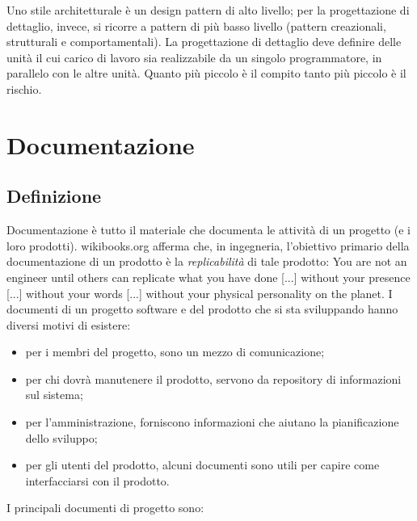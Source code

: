 \documentclass[a4paper]{article}
\begin{document}
		
Uno stile architetturale è un design pattern di alto livello; per la progettazione di dettaglio, invece, si ricorre a pattern di più basso livello (pattern creazionali, strutturali e comportamentali). La progettazione di dettaglio deve definire delle unità il cui carico di lavoro sia realizzabile da un singolo programmatore, in parallelo con le altre unità. Quanto più piccolo è il compito tanto più piccolo è il rischio.
	


		
	\section{Documentazione}


		
	\subsection{Definizione}

		
Documentazione è tutto il materiale che documenta le attività di un progetto (e i loro prodotti). wikibooks.org afferma che, in ingegneria, l'obiettivo primario della documentazione di un prodotto è la \emph{replicabilità} di tale prodotto: You are not an engineer until others can replicate what you have done [...] without your presence [...] without your words [...] without your physical personality on the planet. I documenti di un progetto software e del prodotto che si sta sviluppando hanno diversi motivi di esistere:
		
	\begin{itemize}
		
			
	\item per i membri del progetto, sono un mezzo di comunicazione;
			
	\item per chi dovrà manutenere il prodotto, servono da repository di informazioni sul sistema;
			
	\item per l'amministrazione, forniscono informazioni che aiutano la pianificazione dello sviluppo;
			
	\item per gli utenti del prodotto, alcuni documenti sono utili per capire come interfacciarsi con il prodotto.
		
	\end{itemize}

		
I principali documenti di progetto sono:
		
\end{document}
